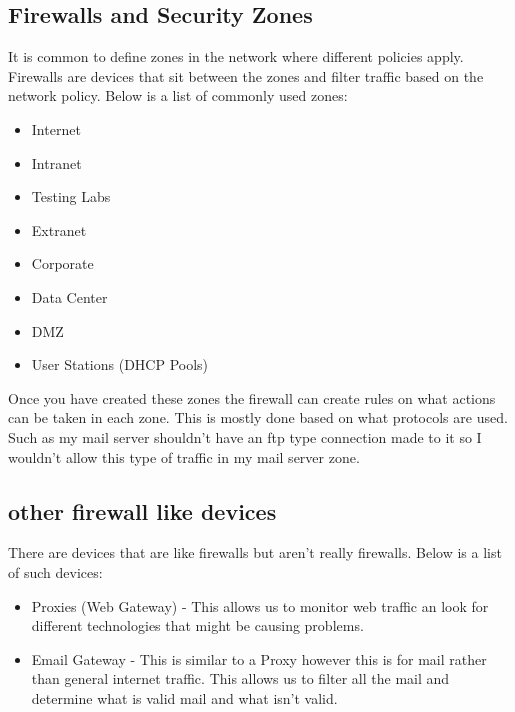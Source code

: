 \documentclass[letterpaper, onecolumn,10pt]{IEEEtran}
\begin{document}
			    \subsection{Firewalls and Security Zones}
			    It is common to define zones in the network where different policies apply. Firewalls are devices that sit between the zones and filter traffic based on the network policy. Below is a list of commonly used zones:
			    \begin{itemize}
			        \item Internet
			        \item Intranet
			        \item Testing Labs
			        \item Extranet
			        \item Corporate
			        \item Data Center
			        \item DMZ
			        \item User Stations (DHCP Pools)
			    \end{itemize}
			    Once you have created these zones the firewall can create rules on what actions can be taken in each zone. This is mostly done based on what protocols are used. Such as my mail server shouldn't have an ftp type connection made to it so I wouldn't allow this type of traffic in my mail server zone.\\
			    
			    \subsection{other firewall like devices}
			     There are devices that are like firewalls but aren't really firewalls. Below is a list of such devices:
			     \begin{itemize}
			         \item Proxies (Web Gateway) - This allows us to monitor web traffic an look for different technologies that might be causing problems.\\
			         \item Email Gateway - This is similar to a Proxy however this is for mail rather than general internet traffic. This allows us to filter all the mail and determine what is valid mail and what isn't valid.\\
			     \end{itemize}
			     
\end{document}
